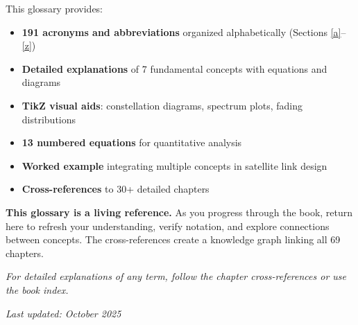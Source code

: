 This glossary provides:
\begin{itemize}
\item \textbf{191 acronyms and abbreviations} organized alphabetically (Sections \ref{a}--\ref{z})
\item \textbf{Detailed explanations} of 7 fundamental concepts with equations and diagrams
\item \textbf{TikZ visual aids}: constellation diagrams, spectrum plots, fading distributions
\item \textbf{13 numbered equations} for quantitative analysis
\item \textbf{Worked example} integrating multiple concepts in satellite link design
\item \textbf{Cross-references} to 30+ detailed chapters
\end{itemize}

\begin{keyconcept}
\textbf{This glossary is a living reference.} As you progress through the book, return here to refresh your understanding, verify notation, and explore connections between concepts. The cross-references create a knowledge graph linking all 69 chapters.
\end{keyconcept}

\vspace{1em}
\noindent\emph{For detailed explanations of any term, follow the chapter cross-references or use the book index.}

\vspace{0.5em}
\noindent\emph{Last updated: October 2025}
